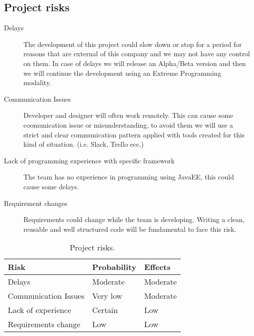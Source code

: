 
\subsection{Project risks}

\begin{description}

\item[Delays] The development of this project could slow down or stop for a period for reasons that are external of this company and we may not have any control on them. In case of delays we will release an Alpha/Beta version and then we will continue the development using an Extreme Programming modality.

\item[Communication Issues] Developer and designer will often work remotely. This can cause some coomunication issue or misunderstanding, to avoid them we will use a strict and clear communication pattern applied with tools created for this kind of situation. (i.e. Slack, Trello ecc.)

\item[Lack of programming experience with specific framework] The team has no experience in programming using JavaEE, this could cause some delays.

\item[Requirement changes] Requirements could change while the team is developing. Writing a clean, reusable and well structured code will be fundamental to face this risk.

\end{description}
\begin{table}[!htbp]
\centering
    \begin{tabular}{| l | l | l |}
        \hline
        \textbf{Risk}           & \textbf{Probability}  & \textbf{Effects}  \\
        \hline
        Delays                  & Moderate                  & Moderate          \\
        \hline
        Communication Issues   & Very low                   & Moderate          \\
        \hline
        Lack of experience      & Certain               & Low          \\
        \hline
        Requirements change     & Low            & Low          \\
        \hline
    \end{tabular}
    \caption{Project risks.}
    \label{tab:project-risks}
\end{table}
